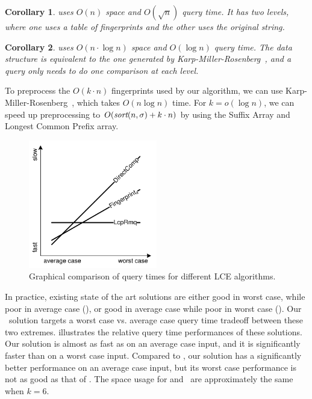 \documentclass[a4]{article}
\newcommand*{\pref}{\prettyref}
\newtheorem{corollary}{Corollary}
\begin{document}
\begin{corollary}
\fprint[2] uses $O(n)$ space and $O(\sqrt n)$ query time. It has two levels, where one uses a table of fingerprints and the other uses the original string.
\end{corollary}

\begin{corollary}
\fprint[\logceil] uses $O(n\cdot\log n)$ space and $O(\log n)$ query time. The data structure is equivalent to the one generated by Karp-Miller-Rosenberg~\cite{karp-miller-rosenberg}, and a query only needs to do one comparison at each level.
\end{corollary}

To preprocess the $O(k\cdot n)$ fingerprints used by our algorithm, we can use Karp-Miller-Rosenberg~\cite{karp-miller-rosenberg}, which takes $O(n\log n)$ time. For $k=o(\log n)$, we can speed up preprocessing to $O(\textit{sort}(n,\sigma) + k\cdot n)$ by using the Suffix Array and Longest Common Prefix array.

\begin{figure}[tp]
    \begin{center}
        \includegraphics[width=0.5\textwidth,page=1]{wc-avg.pdf}
    \end{center}
    \caption{\label{fig:wc-avg}Graphical comparison of query times for different LCE algorithms.}
\end{figure}

In practice, existing state of the art solutions are either good in worst case, while poor in average case (), or good in average case while poor in worst case (). Our \fprintk\ solution targets a worst case vs. average case query time tradeoff between these two extremes. \pref{fig:wc-avg} illustrates the relative query time performances of these solutions. Our solution is almost as fast as  on an average case input, and it is significantly faster than  on a worst case input. Compared to , our solution has a significantly better performance on an average case input, but its worst case performance is not as good as that of . The space usage for  and \fprintk\ are approximately the same when $k=6$.
\end{document}
